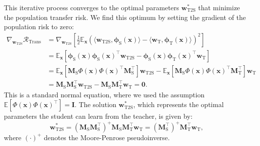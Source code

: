 \documentclass{article}
\theoremstyle{definition}
\theoremstyle{definition}
\theoremstyle{plain}
\theoremstyle{plain}
\theoremstyle{plain}
\theoremstyle{plain}
\theoremstyle{plain}
\newcommand{\bs}[1]{\boldsymbol{\mathbf{#1}}}
\newcommand{\Ex}{\mathbb{E}}
\newcommand{\vecx}{\mathbf{x}}
\newcommand{\te}{\mathrm{T}}
\newcommand{\st}{\mathrm{S}}
\newcommand{\ts}{\mathrm{T2S}}
\newcommand{\M}{\mathbf{M}}
\newcommand{\w}{\mathbf{w}}
\newcommand{\id}{\mathbf{I}}
\begin{document}
This iterative process converges to the optimal parameters $\w^*_\ts$ that minimize the population transfer risk. We find this optimum by setting the gradient of the population risk to zero:
\begin{equation}
\begin{aligned}
\nabla_{\w_\ts}\mathcal{R}_{\mathrm{Trans}} &= \nabla_{\w_\ts}\left[\frac{1}{2}\Ex_\vecx\left(\langle \w_\ts,\bs\phi_\st(\vecx)\rangle-\langle \w_\te,\bs\phi_\te(\vecx)\rangle\right)^2 \right] \\
&= \Ex_\vecx\left[ \bs\phi_\st(\vecx)\bs\phi_\st(\vecx)^\top \w_\ts - \bs\phi_\st(\vecx)\bs\phi_\te(\vecx)^\top \w_\te \right] \\
&= \Ex_\vecx\left[ \M_\st\Phi(\vecx)\Phi(\vecx)^\top\M_\st^\top \right] \w_\ts - \Ex_\vecx\left[ \M_\st\Phi(\vecx)\Phi(\vecx)^\top\M_\te^\top \right] \w_\te \\
&= \M_\st\M_\st^\top \w_\ts - \M_\st\M_\te^\top \w_\te = \mathbf{0}.
\end{aligned}
\end{equation}
This is a standard normal equation, where we used the assumption $\Ex[\Phi(\vecx)\Phi(\vecx)^\top]=\id$. The solution $\w^*_\ts$, which represents the optimal parameters the student can learn from the teacher, is given by:
\begin{equation}
\w^*_\ts = (\M_\st\M_\st^\top)^+ \M_\st\M_\te^\top \w_\te = (\M_\st^\top)^+ \M_\te^\top \w_\te,
\end{equation}
where $(\cdot)^+$ denotes the Moore-Penrose pseudoinverse.
\end{document}
